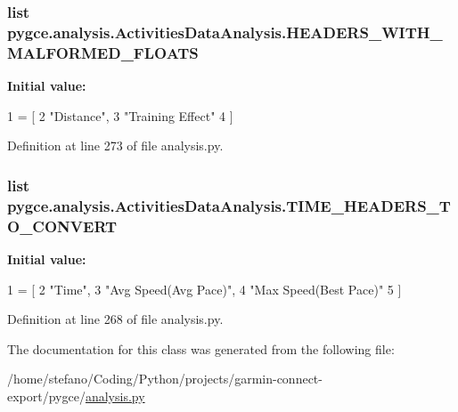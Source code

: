 \subsubsection[{\texorpdfstring{H\+E\+A\+D\+E\+R\+S\+\_\+\+W\+I\+T\+H\+\_\+\+M\+A\+L\+F\+O\+R\+M\+E\+D\+\_\+\+F\+L\+O\+A\+TS}{HEADERS_WITH_MALFORMED_FLOATS}}]{\setlength{\rightskip}{0pt plus 5cm}list pygce.\+analysis.\+Activities\+Data\+Analysis.\+H\+E\+A\+D\+E\+R\+S\+\_\+\+W\+I\+T\+H\+\_\+\+M\+A\+L\+F\+O\+R\+M\+E\+D\+\_\+\+F\+L\+O\+A\+TS\hspace{0.3cm}{\ttfamily [static]}}\hypertarget{classpygce_1_1analysis_1_1_activities_data_analysis_a1f7ff038df4e658a32278a9385bded54}{}\label{classpygce_1_1analysis_1_1_activities_data_analysis_a1f7ff038df4e658a32278a9385bded54}
{\bfseries Initial value\+:}
\begin{DoxyCode}
1 = [
2         \textcolor{stringliteral}{"Distance"},
3         \textcolor{stringliteral}{"Training Effect"}
4     ]
\end{DoxyCode}


Definition at line 273 of file analysis.\+py.

\subsubsection[{\texorpdfstring{T\+I\+M\+E\+\_\+\+H\+E\+A\+D\+E\+R\+S\+\_\+\+T\+O\+\_\+\+C\+O\+N\+V\+E\+RT}{TIME_HEADERS_TO_CONVERT}}]{\setlength{\rightskip}{0pt plus 5cm}list pygce.\+analysis.\+Activities\+Data\+Analysis.\+T\+I\+M\+E\+\_\+\+H\+E\+A\+D\+E\+R\+S\+\_\+\+T\+O\+\_\+\+C\+O\+N\+V\+E\+RT\hspace{0.3cm}{\ttfamily [static]}}\hypertarget{classpygce_1_1analysis_1_1_activities_data_analysis_aad6be4b72fa047730b0c5e53f50f644d}{}\label{classpygce_1_1analysis_1_1_activities_data_analysis_aad6be4b72fa047730b0c5e53f50f644d}
{\bfseries Initial value\+:}
\begin{DoxyCode}
1 = [
2         \textcolor{stringliteral}{"Time"},
3         \textcolor{stringliteral}{"Avg Speed(Avg Pace)"},
4         \textcolor{stringliteral}{"Max Speed(Best Pace)"}
5     ]
\end{DoxyCode}


Definition at line 268 of file analysis.\+py.



The documentation for this class was generated from the following file\+:\begin{DoxyCompactItemize}
\item 
/home/stefano/\+Coding/\+Python/projects/garmin-\/connect-\/export/pygce/\hyperlink{analysis_8py}{analysis.\+py}\end{DoxyCompactItemize}
